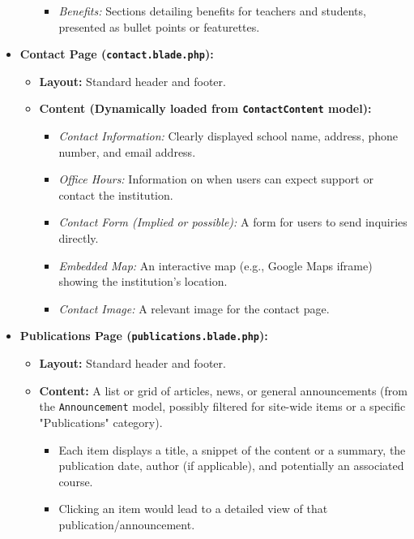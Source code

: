 \begin{itemize}
\begin{itemize}
\begin{itemize}
            \item \textit{Benefits:} Sections detailing benefits for teachers and students, presented as bullet points or featurettes.
        \end{itemize}
    \end{itemize}
    \item \textbf{Contact Page (\texttt{contact.blade.php}):}
    \begin{itemize}
        \item \textbf{Layout:} Standard header and footer.
        \item \textbf{Content (Dynamically loaded from \texttt{ContactContent} model):}
        \begin{itemize}
            \item \textit{Contact Information:} Clearly displayed school name, address, phone number, and email address.
            \item \textit{Office Hours:} Information on when users can expect support or contact the institution.
            \item \textit{Contact Form (Implied or possible):} A form for users to send inquiries directly.
            \item \textit{Embedded Map:} An interactive map (e.g., Google Maps iframe) showing the institution's location.
            \item \textit{Contact Image:} A relevant image for the contact page.
        \end{itemize}
    \end{itemize}
    \item \textbf{Publications Page (\texttt{publications.blade.php}):}
    \begin{itemize}
        \item \textbf{Layout:} Standard header and footer.
        \item \textbf{Content:} A list or grid of articles, news, or general announcements (from the \texttt{Announcement} model, possibly filtered for site-wide items or a specific "Publications" category).
        \begin{itemize}
            \item Each item displays a title, a snippet of the content or a summary, the publication date, author (if applicable), and potentially an associated course.
            \item Clicking an item would lead to a detailed view of that publication/announcement.
        \end{itemize}
    \end{itemize}
\end{itemize}

